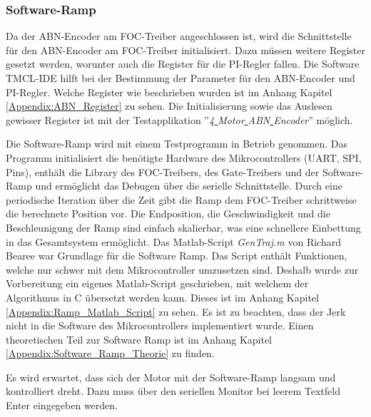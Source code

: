 \subsubsection{Software-Ramp}
\label{subsubsec:Software_Ramp}
 Da der ABN-Encoder am FOC-Treiber angeschlossen ist, wird die Schnittstelle für den ABN-Encoder am FOC-Treiber initialisiert. Dazu müssen weitere Register gesetzt werden, worunter auch die Register für die PI-Regler fallen. Die Software TMCL-IDE hilft bei der Bestimmung der Parameter für den ABN-Encoder und PI-Regler. Welche Register wie beschrieben wurden ist im Anhang Kapitel \ref{Appendix:ABN_Register} zu sehen. Die Initialisierung sowie das Auslesen gewisser Register ist mit der Testapplikation ''\textit{4\underline{ }Motor\underline{ }ABN\underline{ }Encoder}'' möglich.

Die Software-Ramp wird mit einem Testprogramm in Betrieb genommen. Das Programm initialisiert die benötigte Hardware des Mikrocontrollers (UART, SPI, Pins), enthält die Library des FOC-Treibers, des Gate-Treibers und der Software-Ramp und ermöglicht das Debugen über die serielle Schnittstelle. Durch eine periodische Iteration über die Zeit gibt die Ramp dem FOC-Treiber schrittweise die berechnete Position vor. Die Endposition, die Geschwindigkeit und die Beschleunigung der Ramp sind einfach skalierbar, was eine schnellere Einbettung in das Gesamtsystem ermöglicht. Das Matlab-Script \textit{GenTraj.m} von Richard Bearee war Grundlage für die Software Ramp. Das Script enthält Funktionen, welche nur schwer mit dem Mikrocontroller umzusetzen sind. Deshalb wurde zur Vorbereitung ein eigenes Matlab-Script geschrieben, mit welchem der Algorithmus in C übersetzt werden kann. Dieses ist im Anhang Kapitel \ref{Appendix:Ramp_Matlab_Script} zu sehen. Es ist zu beachten, dass der Jerk nicht in die Software des Mikrocontrollers implementiert wurde. Einen theoretischen Teil zur Software Ramp ist im Anhang Kapitel \ref{Appendix:Software_Ramp_Theorie} zu finden.

Es wird erwartet, dass sich der Motor mit der Software-Ramp langsam und kontrolliert dreht. Dazu muss über den seriellen Monitor bei leerem Textfeld Enter eingegeben werden.

